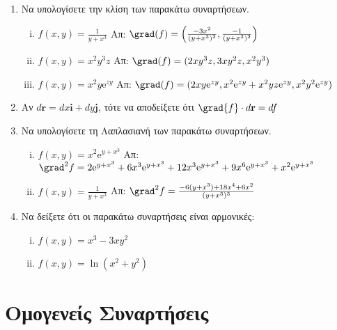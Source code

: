 \begin{enumerate}
  \item Να υπολογίσετε την κλίση των παρακάτω συναρτήσεων.
    \begin{enumerate}[i)]
      \item $ f(x,y) = \frac{1}{y+x^{3}} $ 
        \hfill Απ: $\grad(f) =\left(\frac{-3x^{2}}{(y+x^{3})^{2}},
        \frac{-1}{(y+x^{3})^{2}}\right)$ 
      \item $ f(x,y) = x^{2}y^{3}z $   
        \hfill Απ: $ \grad(f) = (2xy^{3}z,3xy^{2}z,x^{2}y^{3}) $ 
      \item $ f(x,y) = x^{2} y \mathrm{e}^{zy}  $ 
        \hfill Απ: $ \grad(f) = (2xy\mathrm{e}^{zy},
        x^{2}\mathrm{e}^{zy}+x^{2}yz\mathrm{e}^{zy},x^{2}y^{2} \mathrm{e}^{zy})$ 
    \end{enumerate}

  \item Αν $ d\mathbf{r} = dx \mathbf{i}+ dy \mathbf{j}$, τότε να αποδείξετε ότι 
    $ \grad{f} \cdot d \mathbf{r} = df $

  \item Να υπολογίσετε τη Λαπλασιανή των παρακάτω συναρτήσεων.
    \begin{enumerate}[i)]
      \item $ f(x,y) = x^{2} \mathrm{e}^{y+x^{3}} $ 
        \hfill Απ: $ \grad^{2} f = 2 \mathrm{e}^{y+x^{3}} + 6x^{3} \mathrm{e}^{y+x^{3}} 
        + 12x^{3} \mathrm{e}^{y+x^{3}} + 9x^{6} \mathrm{e}^{y+x^{3}} + x^{2}
        \mathrm{e}^{y+x^{3}} $ 
      \item $ f(x,y) = \frac{1}{y+x^{3}} $
        \hfill Απ: $ \grad^{2}f = \frac{-6(y+x^{3})+18x^{4}+6x^{2}}{(y+x^{3})^{3}} $ 
    \end{enumerate}

  \item Να δείξετε ότι οι παρακάτω συναρτήσεις είναι αρμονικές:
    \begin{enumerate}[(i)]
      \item $ f(x,y) = x^{3}-3xy^{2} $
      \item $ f(x,y) = \ln(x^{2} + y^{2}) $
    \end{enumerate}
\end{enumerate}


\section*{Ομογενείς Συναρτήσεις}

